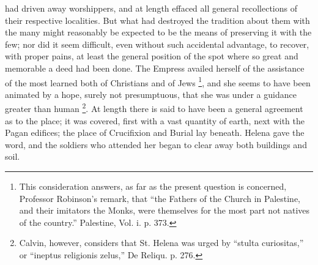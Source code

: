 had driven away worshippers, and at length effaced all general
recollections of their respective localities. But what had destroyed
the tradition about them with the many might reasonably be expected to
be the means of preserving it with the few; nor did it seem difficult,
even without such accidental advantage, to recover, with proper pains,
at least the general position of the spot where so great and memorable
a deed had been done. The Empress availed herself of the assistance of
the most learned both of Christians and of Jews \footnote{This consideration answers, as far as the present question is
concerned, Professor Robinson's remark, that ``the Fathers of the
Church in Palestine, and their imitators the Monks, were themselves
for the most part not natives of the country.'' Palestine, Vol. i. p.
373.}, and she seems to have been animated by a hope, surely not
presumptuous, that she was under a guidance greater than human \footnote{Calvin, however, considers that St. Helena was urged by ``stulta
curiositas,'' or ``ineptus religionis zelus,'' De Reliqu. p. 276.}. At length there is said to have been a general agreement as to
the place; it was covered, first with a vast quantity of earth, next
with the Pagan edifices; the place of Crucifixion and Burial lay
beneath. Helena gave the word, and the soldiers who attended her began
to clear away both buildings and soil.

